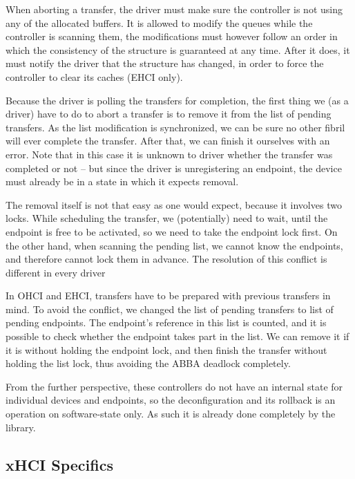 When aborting a transfer, the driver must make sure the controller is not using
any of the allocated buffers. It is allowed to modify the queues while the
controller is scanning them, the modifications must however follow an order in
which the consistency of the structure is guaranteed at any time. After it
does, it must notify the driver that the structure has changed, in order to
force the controller to clear its caches (EHCI only).

Because the driver is polling the transfers for completion, the first thing
we (as a driver) have to do to abort a transfer is to remove it from the list
of pending transfers. As the list modification is synchronized, we can be sure
no other fibril will ever complete the transfer. After that, we can finish it
ourselves with an error. Note that in this case it is unknown to driver whether
the transfer was completed or not -- but since the driver is unregistering an
endpoint, the device must already be in a state in which it expects removal.

The removal itself is not that easy as one would expect, because it involves
two locks. While scheduling the transfer, we (potentially) need to wait, until
the endpoint is free to be activated, so we need to take the endpoint lock first.
On the other hand, when scanning the pending list, we cannot know the
endpoints, and therefore cannot lock them in advance. The resolution of this
conflict is different in every driver


In OHCI and EHCI, transfers have to be prepared with previous transfers in
mind. To avoid the conflict, we changed the list of pending transfers to list
of pending endpoints. The endpoint's reference in this list is counted, and it
is possible to check whether the endpoint takes part in the list. We can remove
it if it is without holding the endpoint lock, and then finish the transfer
without holding the list lock, thus avoiding the ABBA deadlock completely.

From the further perspective, these controllers do not have an internal state
for individual devices and endpoints, so the deconfiguration and its rollback
is an operation on software-state only. As such it is already done completely
by the  library.

\subsection{xHCI Specifics}


